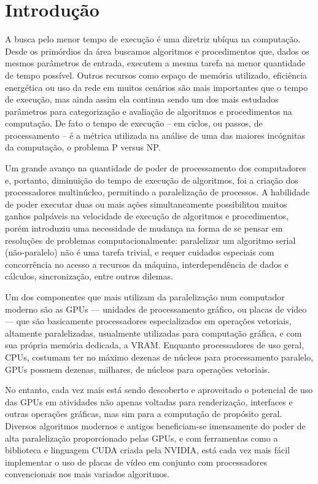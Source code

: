 \documentclass[12pt, %
openright, 
oneside, %
a4paper,    %
brazil]{facom-ufu-abntex2}
\begin{document}
\chapter{Introdução}

A busca pelo menor tempo de execução é uma diretriz ubíqua na computação. Desde os primórdios da área buscamos algoritmos e procedimentos que, dados os mesmos parâmetros de entrada, executem a mesma tarefa na menor quantidade de tempo possível. Outros recursos como espaço de memória utilizado, eficiência energética ou uso da rede em muitos cenários são mais importantes que o tempo de execução, mas ainda assim ela continua sendo um dos mais estudados parâmetros para categorização e avaliação de algoritmos e procedimentos na computação. De fato o tempo de execução -- em ciclos, ou passos, de processamento -- é a métrica utilizada na análise de uma das maiores incógnitas da computação, o problema P versus NP.


Um grande avanço na quantidade de poder de processamento dos computadores e, portanto, diminuição do tempo de execução de algoritmos, foi a criação dos processadores multinúcleo, permitindo a paralelização de processos. A habilidade de poder executar duas ou mais ações simultaneamente possibilitou muitos ganhos palpáveis na velocidade de execução de algoritmos e procedimentos, porém introduziu uma necessidade de mudança na forma de se pensar em resoluções de problemas computacionalmente: paralelizar um algoritmo serial (não-paralelo) não é uma tarefa trivial, e requer cuidados especiais com concorrência no acesso a recursos da máquina, interdependência de dados e cálculos, sincronização, entre outros dilemas.

Um dos componentes que mais utilizam da paralelização num computador moderno são as GPUs --- unidades de processamento gráfico, ou placas de vídeo --- que são basicamente processadores especializados em operações vetoriais, altamente paralelizadas, usualmente utilizadas para computação gráfica, e com sua própria memória dedicada, a VRAM. Enquanto processadores de uso geral, CPUs, costumam ter no máximo dezenas de núcleos para processamento paralelo, GPUs possuem dezenas, milhares, de núcleos para operações vetoriais.

No entanto, cada vez mais está sendo descoberto e aproveitado o potencial de uso das GPUs em atividades não apenas voltadas para renderização, interfaces e outras operações gráficas, mas sim para a computação de propósito geral. Diversos algoritmos modernos e antigos beneficiam-se imensamente do poder de alta paralelização proporcionado pelas GPUs, e com ferramentas como a biblioteca e linguagem CUDA criada pela NVIDIA, está cada vez mais fácil implementar o uso de placas de vídeo em conjunto com processadores convencionais nos mais variados algoritmos.
\end{document}
